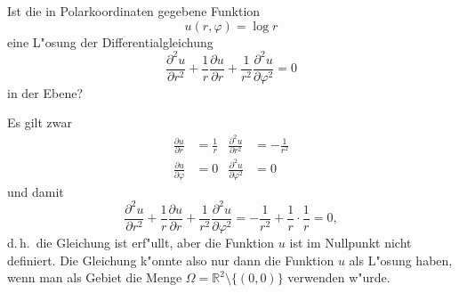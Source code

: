 Ist die in Polarkoordinaten gegebene Funktion
\[
u(r,\varphi)=\log r
\]
eine L"osung der Differentialgleichung
\[
\frac{\partial^2u}{\partial r^2} +\frac1r\frac{\partial u}{\partial r}+\frac1{r^2}\frac{\partial^2 u}{\partial \varphi^2}=0
\]
in der Ebene?

\begin{loesung}
Es gilt zwar
\begin{align*}
\frac{\partial u}{\partial r}
&=
\frac1r
&
\frac{\partial^2 u}{\partial r^2}
&=
-\frac1{r^2}
\\
\frac{\partial u}{\partial \varphi}
&=
0
&
\frac{\partial^2 u}{\partial \varphi^2}
&=
0
\end{align*}
und damit
\[
\frac{\partial^2u}{\partial r^2}
+\frac1r\frac{\partial u}{\partial r}
+\frac1{r^2}\frac{\partial^2 u}{\partial \varphi^2}
=
-\frac1{r^2}
+\frac1r\cdot\frac1r=0,
\]
d.\,h.~die Gleichung ist erf"ullt, aber die Funktion $u$ ist im Nullpunkt
nicht definiert. Die Gleichung k"onnte also nur dann die Funktion $u$
als L"osung haben, wenn man als Gebiet die Menge
$\Omega=\mathbb R^2\setminus\{(0,0)\}$ verwenden w"urde.
\end{loesung}
